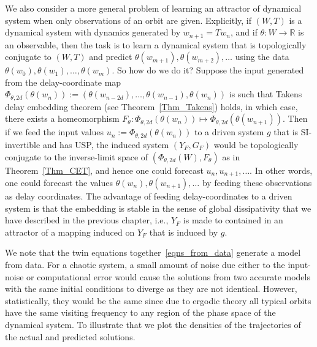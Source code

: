 We also consider a more general problem of learning an attractor of dynamical system when only observations of an orbit are given. Explicitly, if $(W,T)$ is a dynamical system with dynamics generated by $w_{n+1}=Tw_n$, and if $\theta:W \to \mathbb{R}$ is an observable, then the task is to learn a dynamical system that is topologically conjugate to $(W,T)$ and predict $\theta(w_{m+1}),\theta(w_{m+2}),\ldots$ using the data $\theta(w_{0}),\theta(w_{1}),\ldots,\theta(w_{m})$.  So how do we do it?
Suppose the input generated from the delay-coordinate map $\Phi_{\theta,2d}(\theta(w_{n})) := (\theta(w_{n-2d}),\ldots,\theta(w_{n-1}),\theta(w_{n}))$ is such that Takens delay embedding theorem (see Theorem~\ref{Thm_Takens}) holds, in which case, there exists a homeomorphism  $F_\theta: \Phi_{\theta,2d}(\theta(w_{n})) \mapsto \Phi_{\theta,2d}(\theta(w_{n+1}))$. Then if we feed  the input values $u_n := \Phi_{\theta,2d}(\theta(w_{n}))$ to a driven system $g$ that is SI-invertible and has USP, the induced system $(Y_F,G_F)$ would be topologically conjugate to the inverse-limit space of
$(\Phi_{\theta,2d}(W), F_\theta)$ as in Theorem~\ref{Thm_CET}, and hence one could forecast $u_n,u_{n+1},\ldots$. In other words, one could forecast  the values $\theta(w_n), \theta(w_{n+1}),\ldots$ by feeding these observations as delay coordinates. The advantage of feeding delay-coordinates to a driven system is that the embedding is stable in the sense of global dissipativity that we have described in the previous chapter, i.e., $Y_F$ is made to contained in an attractor of a mapping induced on $Y_F$ that is induced by $g$. 

We note that the twin equations together~\ref{eqns_from_data} generate a model from data. For a chaotic system, a small amount of noise due either to the input-noise or computational error would cause the solutions from two accurate models with the same initial conditions to  diverge as they are not identical.  However, statistically, they would be the same since due to ergodic theory all typical orbits have the same visiting frequency to any region of the phase space of the dynamical system.  To illustrate that we plot the densities of the trajectories of the actual and predicted solutions. 

